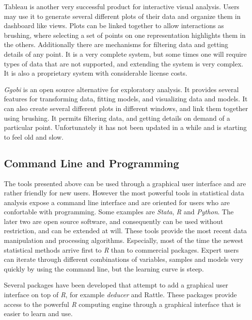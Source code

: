 
Tableau \autocite{hanrahan_tableau_2003} is another very successful  product for interactive visual analysis. Users may use it to generate several different plots of their data and organize them in dashboard like views. Plots can be linked together to allow interactions as brushing, where selecting a set of points on one representation highlights them in the others. Additionally there are mechanisms for filtering data and getting details of any point. 
It is a very complete system, but some times one will require types of data that are not supported, and extending the system is very complex. It is also a proprietary system with considerable license costs. 

\emph{Ggobi} \autocite{cook_interactive_2007} is an open source alternative for exploratory analysis. It provides several features for transforming data, fitting models, and visualizing data and models. It can also create several different plots in different windows, and link them together using brushing. It permits filtering data, and getting details on demand of a particular point. Unfortunately it has not been updated in a while and is starting to feel old and slow.


\subsection{Command Line and Programming}

The tools presented above can be used through a graphical user interface and are rather friendly for new users. However the most powerful tools in statistical data analysis expose a command line interface and are oriented for users who are confortable with programming. Some examples are \emph{Stata}, \emph{R} \autocite{team_r:_2012} and \emph{Python}. The later two are open source software, and consequently can be used without restriction, and can be extended at will. These tools provide the most recent data manipulation and processing algorithms. Especially, most of the time the newest statistical methods arrive first to \emph{R} than to commercial packages. Expert users can iterate through different combinations of variables, samples and models very quickly by using the command line, but the learning curve is steep. 

Several packages have been developed that attempt to add a graphical user interface on top of \emph{R}, for example \emph{deducer} and Rattle. These packages provide access to the powerful \emph{R} computing engine through a graphical interface that is easier to learn and use. 

